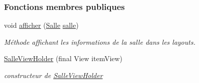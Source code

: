 \subsubsection*{Fonctions membres publiques}
\begin{DoxyCompactItemize}
\item 
void \hyperlink{classcom_1_1lasalle_1_1meeting_1_1_salle_view_holder_ac9f5e4bd25c8abc50ad524e0c2132304}{afficher} (\hyperlink{classcom_1_1lasalle_1_1meeting_1_1_salle}{Salle} \hyperlink{classcom_1_1lasalle_1_1meeting_1_1_salle_view_holder_afe85265c9d35c5035e96ace9c8032606}{salle})
\begin{DoxyCompactList}\small\item\em Méthode affichant les informations de la salle dans les layouts. \end{DoxyCompactList}\item 
\hyperlink{classcom_1_1lasalle_1_1meeting_1_1_salle_view_holder_ab123df6edb081221dc36daff6f8c1763}{Salle\+View\+Holder} (final View item\+View)
\begin{DoxyCompactList}\small\item\em constructeur de \hyperlink{classcom_1_1lasalle_1_1meeting_1_1_salle_view_holder}{Salle\+View\+Holder} \end{DoxyCompactList}\end{DoxyCompactItemize}
